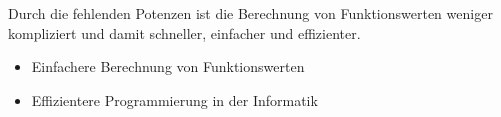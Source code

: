 \begin{aufgaben}
Durch die fehlenden Potenzen ist die Berechnung von Funktionswerten weniger kompliziert und damit schneller, einfacher und effizienter.
\begin{itemize}
\item Einfachere Berechnung von Funktionswerten
\item Effizientere Programmierung in der Informatik
\end{itemize}
\end{aufgaben}